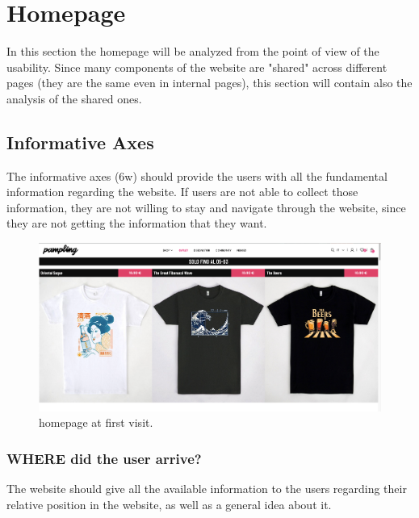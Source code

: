 \section{Homepage}
In this section the homepage will be analyzed from the point of view of the usability. 
Since many components of the website are "shared" across different pages (they are the same even in internal pages), this section will contain also the analysis of the shared ones.

\subsection{Informative Axes}
The informative axes (6w) should provide the users with all the fundamental information regarding the website. 
If users are not able to collect those information, they are not willing to stay and navigate through the website, since they are not getting the information that they want.

\begin{figure}[h!]
	\centering
	\includegraphics[scale=0.225]{images/homepage-first.png}
	\caption{homepage at first visit.}
	\label{fig:homepage-first}
\end{figure}

\subsubsection{WHERE did the user arrive?}
The website should give all the available information to the users regarding their relative position in the website, as well as a general idea about it. \\

